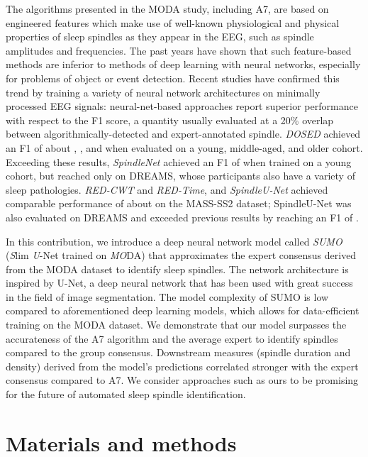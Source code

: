 \documentclass[fleqn,twocolumn,10pt]{wlscirep}
\begin{document}
The algorithms presented in the MODA study, including A7, are based on engineered
features which make use of
well-known physiological and physical properties of sleep spindles as they
appear in the EEG, such as spindle amplitudes and frequencies\cite{Schimicek1994,Moelle2002,Ferrarelli2007,Wamsley2012,
Martin2013,Parekh2015,Lacourse2019}.
The past years have shown that such feature-based methods are inferior to
methods of deep learning with neural networks, especially for problems of
object or event detection\cite{Schmidhuber2015, LeCun2015, Goodfellow2016}.
Recent studies have confirmed this trend by training a variety of neural
network architectures on minimally processed EEG signals: neural-net-based
approaches report superior performance with respect to the F1 score,
a quantity usually evaluated at a 20\% overlap between algorithmically-detected
and expert-annotated spindle.
\textit{DOSED}\cite{Chambon2019} achieved an F1 of about , , and
 when evaluated on a young, middle-aged, and older cohort.
Exceeding these results, \textit{SpindleNet}\cite{Kulkarni2019} achieved an F1
of  when trained on a young cohort, but reached only  on
DREAMS, whose participants also have a variety of sleep pathologies.
\textit{RED-CWT} and \textit{RED-Time}\cite{Tapia2020}, and
\textit{SpindleU-Net}\cite{You2021} achieved comparable performance of about
 on the MASS-SS2 dataset; SpindleU-Net was also evaluated on DREAMS and
exceeded previous results by reaching an F1 of .

In this contribution, we introduce a deep neural network model called
\emph{SUMO}\cite{Kaulen2022a} (\emph{S}lim \emph{U}-Net trained on \emph{MO}DA) that approximates the expert consensus derived from the MODA
dataset to identify sleep spindles.  The network architecture is inspired by
U-Net\cite{Ronneberger2015}, a deep neural network that has been used with
great success in the field of image segmentation\cite{Siddique2021}.  The model
complexity of SUMO is low compared to aforementioned deep learning models, which
allows for data-efficient training on the MODA dataset.  We demonstrate that
our model surpasses the accurateness of the A7 algorithm and the average expert
to identify spindles compared to the group consensus.  Downstream measures
(spindle duration and density) derived from the model's predictions correlated
stronger with the expert consensus compared to A7.  We consider approaches such
as ours to be promising for the future of automated sleep spindle
identification.
 
\section{Materials and methods}
\label{sec:methods}
\end{document}
